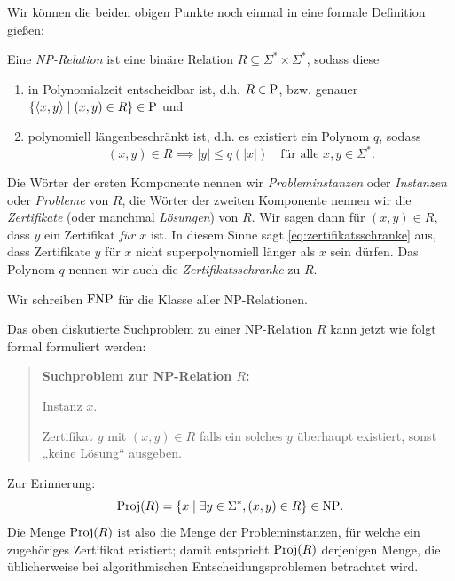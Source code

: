 Wir können die beiden obigen Punkte noch einmal in eine formale Definition gießen:
\begin{definition}\label{def:np-relation}
    Eine \emph{NP-Relation} ist eine binäre Relation $R\subseteq \Sigma^*\times\Sigma^*$, sodass diese
    \begin{enumerate}
        \item in Polynomialzeit entscheidbar ist, d.h. $R\in\P$, bzw. genauer $\{\langle x, y\rangle \mid (x,y)\in R\}\in\P$ und
        \item polynomiell längenbeschränkt ist, d.h. es existiert ein Polynom $q$, sodass
            \begin{equation}\label{eq:zertifikatsschranke}
                (x,y)\in R \implies |y|\leq q(|x|) \quad\text{für alle $x,y\in\Sigma^*$}.
            \end{equation}
    \end{enumerate}
    Die Wörter der ersten Komponente nennen wir \emph{Probleminstanzen} oder \emph{Instanzen} oder \emph{Probleme} von $R$, die Wörter der zweiten Komponente nennen wir die \emph{Zertifikate} (oder manchmal \emph{Lösungen}) von $R$. Wir sagen dann für $(x,y)\in R$, dass $y$ ein Zertifikat \emph{für $x$} ist. In diesem Sinne sagt \eqref{eq:zertifikatsschranke}  aus, dass Zertifikate $y$ für $x$ nicht superpolynomiell länger als $x$ sein dürfen.
    Das Polynom $q$ nennen wir auch die \emph{Zertifikatsschranke} zu $R$. 

    Wir schreiben $\FNP$ für die Klasse aller NP-Relationen. \qedhere
\end{definition}
Das oben diskutierte Suchproblem zu einer NP-Relation $R$ kann jetzt wie folgt formal formuliert werden:
\begin{quote}
    \textbf{Suchproblem zur NP-Relation $R$:}
    \begin{description}[nosep]
        \item[Gegeben:] Instanz $x$.
        \item[Gesucht:] Zertifikat $y$ mit $(x,y)\in  R$ falls ein solches $y$ überhaupt existiert, sonst „keine Lösung“ ausgeben.
    \end{description}
\end{quote}
Zur Erinnerung:
\[ \Proj(R) = \{ x \mid \exists y\in\Sigma^*, (x,y)\in R \}\in\NP. \]
Die Menge $\Proj(R)$ ist also die Menge der Probleminstanzen, für welche ein zugehöriges Zertifikat existiert; damit entspricht $\Proj(R)$ derjenigen Menge, die üblicherweise bei algorithmischen Entscheidungsproblemen betrachtet wird. 
